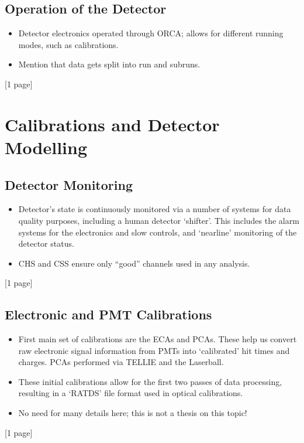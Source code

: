 {    \subsection{Operation of the Detector}
    \begin{itemize}
        \item Detector electronics operated through ORCA; allows for different running modes, such as calibrations.
        \item Mention that data gets split into run and subruns.
    \end{itemize}
    [1 page]
    \section{Calibrations and Detector Modelling}
    \subsection{Detector Monitoring}
    \begin{itemize}
        \item Detector's state is continuously monitored via a number of systems for data quality purposes, including a human detector `shifter'. This includes the alarm systems for the electronics and slow controls, and `nearline' monitoring of the detector status.
        \item CHS and CSS ensure only ``good'' channels used in any analysis.
    \end{itemize}
    [1 page]
    \subsection{Electronic and PMT Calibrations}
    \begin{itemize}
        \item First main set of calibrations are the ECAs and PCAs. These help us convert raw electronic signal information from PMTs into `calibrated' hit times and charges. PCAs performed via TELLIE and the Laserball.
        \item These initial calibrations allow for the first two passes of data processing, resulting in a `RATDS' file format used in optical calibrations.
        \item No need for many details here; this is not a thesis on this topic!
    \end{itemize}
    [1 page]
}
